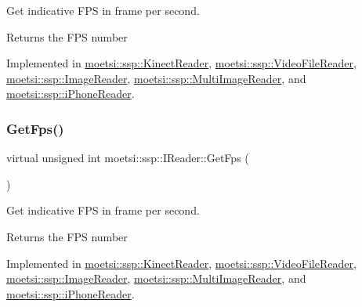 Get indicative F\+PS in frame per second. 

\begin{DoxyReturn}{Returns}
the F\+PS number 
\end{DoxyReturn}


Implemented in \hyperlink{classmoetsi_1_1ssp_1_1KinectReader_ac88c13693ce8e2e249438ac8de8a7b3c}{moetsi\+::ssp\+::\+Kinect\+Reader}, \hyperlink{classmoetsi_1_1ssp_1_1VideoFileReader_a83359ad82898acdb75240568b182247c}{moetsi\+::ssp\+::\+Video\+File\+Reader}, \hyperlink{classmoetsi_1_1ssp_1_1ImageReader_a86adfec8106c366aaf1ec63e2a7da156}{moetsi\+::ssp\+::\+Image\+Reader}, \hyperlink{classmoetsi_1_1ssp_1_1MultiImageReader_ad0a249af66f8e1a063c3e575fc1b94cb}{moetsi\+::ssp\+::\+Multi\+Image\+Reader}, and \hyperlink{classmoetsi_1_1ssp_1_1iPhoneReader_a4bb216847a6c2ed8eb5d31788a0b8477}{moetsi\+::ssp\+::i\+Phone\+Reader}.

\mbox{\label{classmoetsi_1_1ssp_1_1IReader_a9f6a8650ca290b011b8e5451eeae9f32}} 
\subsubsection{\texorpdfstring{Get\+Fps()}{GetFps()}\hspace{0.1cm}{\footnotesize\ttfamily [2/2]}}
{\footnotesize\ttfamily virtual unsigned int moetsi\+::ssp\+::\+I\+Reader\+::\+Get\+Fps (\begin{DoxyParamCaption}{ }\end{DoxyParamCaption})\hspace{0.3cm}{\ttfamily [pure virtual]}}



Get indicative F\+PS in frame per second. 

\begin{DoxyReturn}{Returns}
the F\+PS number 
\end{DoxyReturn}


Implemented in \hyperlink{classmoetsi_1_1ssp_1_1KinectReader_ac88c13693ce8e2e249438ac8de8a7b3c}{moetsi\+::ssp\+::\+Kinect\+Reader}, \hyperlink{classmoetsi_1_1ssp_1_1VideoFileReader_a83359ad82898acdb75240568b182247c}{moetsi\+::ssp\+::\+Video\+File\+Reader}, \hyperlink{classmoetsi_1_1ssp_1_1ImageReader_a86adfec8106c366aaf1ec63e2a7da156}{moetsi\+::ssp\+::\+Image\+Reader}, \hyperlink{classmoetsi_1_1ssp_1_1MultiImageReader_ad0a249af66f8e1a063c3e575fc1b94cb}{moetsi\+::ssp\+::\+Multi\+Image\+Reader}, and \hyperlink{classmoetsi_1_1ssp_1_1iPhoneReader_a4bb216847a6c2ed8eb5d31788a0b8477}{moetsi\+::ssp\+::i\+Phone\+Reader}.

